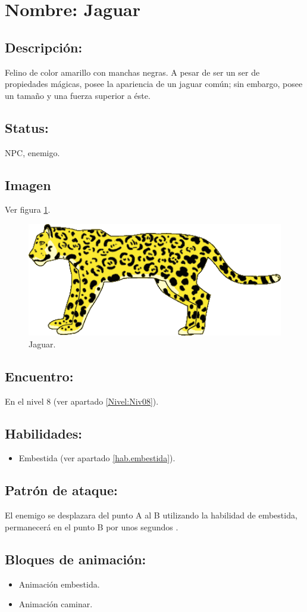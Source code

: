 \section{Nombre: Jaguar}   \label{per:jaguar}
\subsection{Descripción:}
Felino de color amarillo con manchas negras. A pesar de ser un ser de propiedades mágicas, posee la apariencia de un jaguar común; sin embargo, posee un tamaño y una fuerza superior a éste.
\subsection{Status:}
NPC, enemigo.
\subsection{Imagen}
Ver figura \ref{fig:jaguar}.
\begin{figure}
	\centering
	\includegraphics[height=0.2 \textheight]{Imagenes/jaguar}
	\caption{Jaguar.}
	\label{fig:jaguar}
\end{figure}
\subsection{Encuentro:}
En el nivel 8 (ver apartado \ref{Nivel:Niv08}).
\subsection{Habilidades:}
\begin{itemize}
	\item Embestida (ver apartado \ref{hab.embestida}).
\end{itemize}
\subsection{Patrón de ataque:}
El enemigo se desplazara del punto A al B utilizando la habilidad de embestida, permanecerá en el punto B por unos segundos .
\subsection{Bloques de animación:}
	\begin{itemize}
		\item Animación embestida.
		\item Animación caminar.
	\end{itemize}